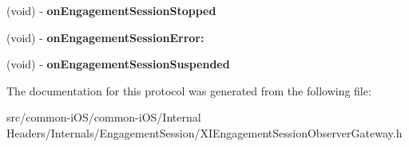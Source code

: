 \begin{DoxyCompactItemize}
(void) -\/ {\bfseries on\+Engagement\+Session\+Stopped}
\item 
\hypertarget{protocol_x_i_engagement_session_observer_gateway_delegate_01-p_a33013b6eccc089b420777f7888dc2b09}{}\label{protocol_x_i_engagement_session_observer_gateway_delegate_01-p_a33013b6eccc089b420777f7888dc2b09} 
(void) -\/ {\bfseries on\+Engagement\+Session\+Error\+:}
\item 
\hypertarget{protocol_x_i_engagement_session_observer_gateway_delegate_01-p_a2128e8490553a879a795de9a07e36b2b}{}\label{protocol_x_i_engagement_session_observer_gateway_delegate_01-p_a2128e8490553a879a795de9a07e36b2b} 
(void) -\/ {\bfseries on\+Engagement\+Session\+Suspended}
\end{DoxyCompactItemize}


The documentation for this protocol was generated from the following file\+:\begin{DoxyCompactItemize}
\item 
src/common-\/i\+O\+S/common-\/i\+O\+S/\+Internal Headers/\+Internals/\+Engagement\+Session/X\+I\+Engagement\+Session\+Observer\+Gateway.\+h\end{DoxyCompactItemize}
